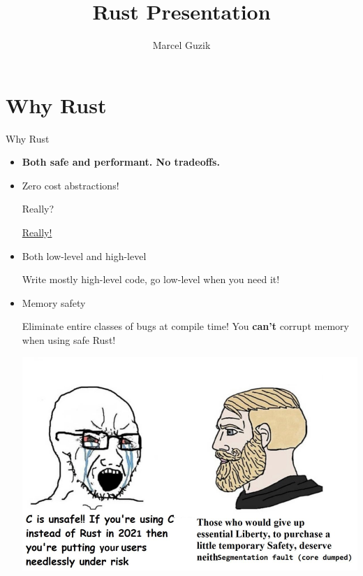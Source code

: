 \documentclass[
  9pt,
  ignorenonframetext,
]{beamer}
\title{Rust Presentation}
\author{Marcel Guzik}
\date{}
\begin{document}
\frame{\titlepage}

\hypertarget{why-rust}{%
\section{Why Rust}\label{why-rust}}

\begin{frame}{Why Rust}
\begin{itemize}
\item
  \textbf{Both safe and performant. No tradeoffs.}
\item
  Zero cost abstractions!

  Really?

  \href{https://pkolaczk.github.io/overhead-of-optional/}{Really!}
\item
  Both low-level and high-level

  Write mostly high-level code, go low-level when you need it!
\end{itemize}
\end{frame}

\begin{frame}
\begin{itemize}
\item
  Memory safety

  Eliminate entire classes of bugs at compile time! You \textbf{can't}
  corrupt memory when using safe Rust!

  \includegraphics{img/memorysafety.jpg}
\end{itemize}
\end{frame}
\end{document}
